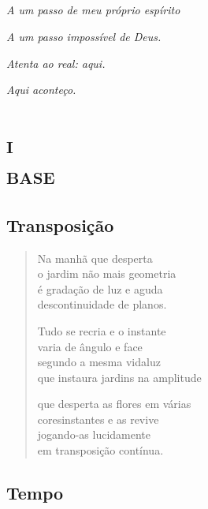 \chapter*{}
\thispagestyle{empty}
\mbox{}
\vfill
\hfill\emph{A um passo de meu próprio espírito}

\hfill\emph{A um passo impossível de Deus.}

\hfill\emph{Atenta ao real: aqui.}

\hfill\emph{Aqui aconteço.}

\part*{\textsc{i}\\\textsc{base}}

\chapter{Transposição}

\begin{verse}
Na manhã que desperta\\
o jardim não mais geometria\\
é gradação de luz e aguda\\
descontinuidade de planos.

Tudo se recria e o instante\\
varia de ângulo e face\\
segundo a mesma vidaluz\\
que instaura jardins na amplitude

que desperta as flores em várias\\
coresinstantes e as revive\\
jogando-as lucidamente\\
em transposição contínua.
\end{verse}

\chapter{Tempo}

